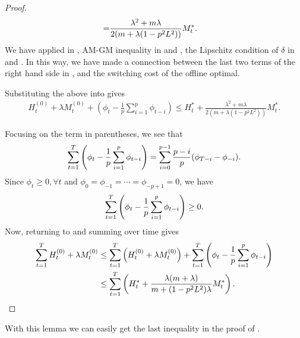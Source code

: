 \begin{proof}
\begin{subequations}
\begin{align}
    =&\frac{\lambda^2+m\lambda}{2(m+\lambda(1-p^2L^2))}M_t^*.\notag
\end{align}
\end{subequations}
We have applied  in , AM-GM inequality in  and , the Lipschitz condition of $\delta$ in  and . In this way, we have made a connection between the last two terms of the right hand side in , and the switching cost of the offline optimal. 

Substituting the above into  gives
\begin{align}\label{appendix.nonlinear.lemma.2}
    H_t^{(0)}+\lambda M_t^{(0)}+\left(\phi_t-\frac{1}{p}\sum_{i=1}^p\phi_{t-i}\right)\le H_t^*+\frac{\lambda^2+m\lambda}{2(m+\lambda(1-p^2L^2))}M_t^*.
\end{align}

Focusing on the term in parentheses, we see that 
\begin{align}
    \sum_{t=1}^T\left(\phi_t-\frac{1}{p}\sum_{i=1}^p\phi_{t-i}\right)=\sum_{i=0}^{p-1}\frac{p-i}{p}(\phi_{T-i}-\phi_{-i}).\notag
\end{align}
Since $\phi_t\ge0,\forall t$ and $\phi_0=\phi_{-1}=\cdots=\phi_{-p+1}=0$, we have
\begin{align}
     \sum_{t=1}^T\left(\phi_t-\frac{1}{p}\sum_{i=1}^p\phi_{t-i}\right)\ge0.\notag
\end{align}
Now, returning to  and summing over time gives
\begin{align}
    \sum_{t=1}^TH_t^{(0)}+\lambda M_t^{(0)}&\le\sum_{t=1}^T\left(H_t^{(0)}+\lambda M_t^{(0)}\right)+\sum_{t=1}^T\left(\phi_t-\frac{1}{p}\sum_{i=1}^p\phi_{t-i}\right)\notag\\
    &\le\sum_{t=1}^T\left(H_t^*+\frac{\lambda(m+\lambda)}{m+(1-p^2L^2)\lambda}M_t^*\right).\notag
\end{align}
\end{proof}
With this lemma we can easily get the last inequality in the proof of .



